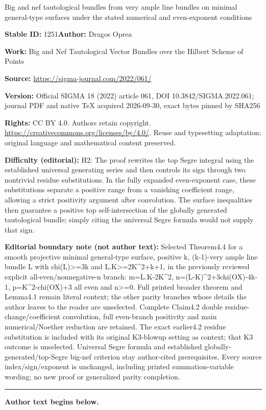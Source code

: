 \documentclass[11pt]{article}
\numberwithin{equation}{section}
\numberwithin{equation}{section}
\begin{document}
\begin{center}\Large Big and nef tautological bundles from very ample line bundles on minimal general-type surfaces under the stated numerical and even-exponent conditions\end{center}
\noindent\textbf{Stable ID:} 1251\quad\textbf{Author:} Dragos Oprea\par
\noindent\textbf{Work:} Big and Nef Tautological Vector Bundles over the Hilbert Scheme of Points\par
\noindent\textbf{Source:} \url{https://sigma-journal.com/2022/061/}\par
\noindent\textbf{Version:} Official SIGMA 18 (2022) article 061, DOI 10.3842/SIGMA.2022.061; journal PDF and native TeX acquired 2026-09-30, exact bytes pinned by SHA256\par
\noindent\textbf{Rights:} CC BY 4.0. Authors retain copyright. \url{https://creativecommons.org/licenses/by/4.0/}. Reuse and typesetting adaptation; original language and mathematical content preserved.\par
\noindent\textbf{Difficulty (editorial):} {\CJKfont H2: The proof rewrites the top Segre integral using the established universal generating series and then controls its sign through two nontrivial residue substitutions. In the fully expanded even-exponent case, these substitutions separate a positive range from a vanishing coefficient range, allowing a strict positivity argument after convolution. The surface inequalities then guarantee a positive top self-intersection of the globally generated tautological bundle; simply citing the universal Segre formula would not supply that sign.}\par
\medskip\noindent\textbf{Editorial boundary note (not author text):} Selected Theorem4.4 for a smooth projective minimal general-type surface, positive k, (k-1)-very ample line bundle L with chi(L)>=3k and L.K>=2K\textasciicircum{}2+k+1, in the previously reviewed explicit all-even/nonnegative-n branch: m=L.K-2K\textasciicircum{}2, n=(L-K)\textasciicircum{}2+3chi(OX)-4k-1, p=K\textasciicircum{}2-chi(OX)+3 all even and n>=0. Full printed broader theorem and Lemma4.1 remain literal context; the other parity branches whose details the author leaves to the reader are unselected. Complete Claim4.2 double residue-change/coefficient convolution, full even-branch positivity and main numerical/Noether reduction are retained. The exact earlier4.2 residue substitution is included with its original K3-blowup setting as context; that K3 outcome is unselected. Universal Segre formula and established globally-generated/top-Segre big-nef criterion stay author-cited prerequisites. Every source index/sign/exponent is unchanged, including printed summation-variable wording; no new proof or generalized parity completion.\par
\medskip\hrule\medskip\noindent\textbf{Author text begins below.}\par
\setcounter{section}{0}
\end{document}
